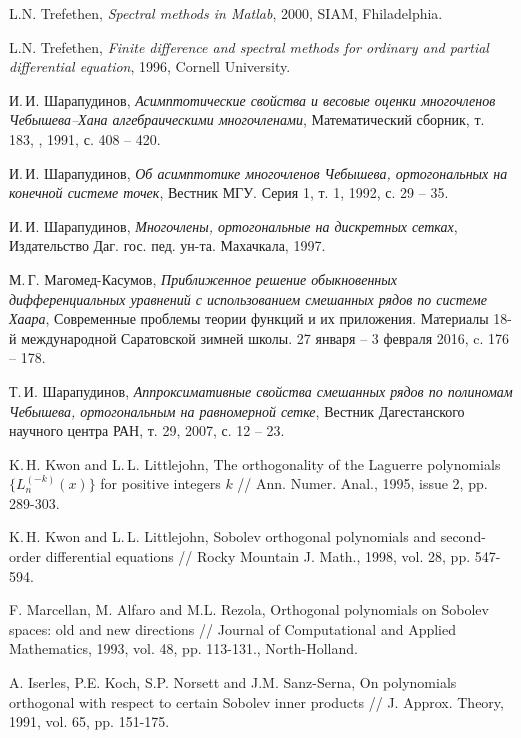 L.N. Trefethen,
\textit{Spectral methods in Matlab}, 2000, SIAM, Fhiladelphia.

L.N. Trefethen,
\textit{Finite difference and spectral methods for ordinary and partial differential equation},
1996, Cornell University.

И.\,И. Шарапудинов,
\textit{Асимптотические свойства и весовые оценки многочленов Чебышева–Хана алгебраическими многочленами},
Математический сборник, т. 183, , 1991, с. 408 -- 420.

И.\,И. Шарапудинов,
\textit{Об асимптотике многочленов Чебышева, ортогональных на конечной системе точек},
Вестник МГУ. Серия 1, т. 1, 1992, с. 29 -- 35.

И.\,И. Шарапудинов,
\textit{Многочлены, ортогональные на дискретных сетках},
Издательство Даг. гос. пед. ун-та. Махачкала, 1997.

М.\,Г. Магомед-Касумов,
\textit{Приближенное решение обыкновенных дифференциальных уравнений с использованием смешанных рядов по системе Хаара},
Современные проблемы теории функций и их приложения. Материалы 18-й международной Саратовской зимней школы.  27 января -- 3 февраля 2016, c. 176 -- 178.

Т.\,И. Шарапудинов,
\textit{Аппроксимативные свойства смешанных рядов по полиномам Чебышева, ортогональным на равномерной сетке},
Вестник Дагестанского научного центра РАН, т. 29, 2007, с. 12 -- 23.

 K.\,H. Kwon and L.\,L. Littlejohn, The orthogonality of the Laguerre polynomials $\{L_n^{(-k)}(x)\}$ for positive integers $k$ // Ann. Numer. Anal., 1995, issue 2, pp. 289-303.

 K.\,H. Kwon and L.\,L. Littlejohn, Sobolev orthogonal polynomials and second-order differential equations // Rocky Mountain J. Math., 1998, vol. 28, pp. 547-594.

 F. Marcellan, M. Alfaro and M.L. Rezola, Orthogonal polynomials on Sobolev spaces: old and new directions // Journal of Computational and Applied Mathematics, 1993, vol. 48, pp. 113-131., North-Holland.

 A. Iserles, P.E. Koch, S.P. Norsett and J.M. Sanz-Serna, On polynomials  orthogonal  with respect  to certain Sobolev inner products // J. Approx. Theory, 1991, vol. 65, pp. 151-175.

